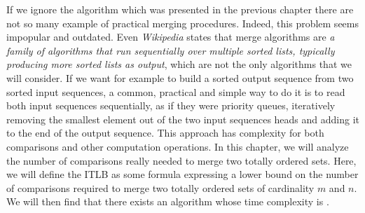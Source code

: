 \label{tree:merging:intro}

If we ignore the \mergesort algorithm which was presented in
the previous chapter there are not so many example of practical merging
procedures. Indeed, this problem seems impopular and outdated. Even
\emph{Wikipedia} states that merge algorithms are \emph{a family of algorithms
that run sequentially over multiple sorted lists, typically producing more
sorted lists as output}, which are not the only algorithms that we will
consider. If we want for example to build a sorted output sequence from two
sorted input sequences, a common, practical and simple way to do it is to read
both input sequences sequentially, as if they were priority queues, iteratively
removing the smallest element out of the two input sequences heads and adding
it to the end of the output sequence. This approach has  complexity for
both comparisons and other computation operations. In this chapter, we will
analyze the number of comparisons really needed to merge two totally
ordered sets. Here, we will define the ITLB as some formula expressing a lower
bound on the number of comparisons required to merge two totally ordered sets
of cardinality $m$ and $n$. We will then find that there exists an algorithm
whose time complexity is .

